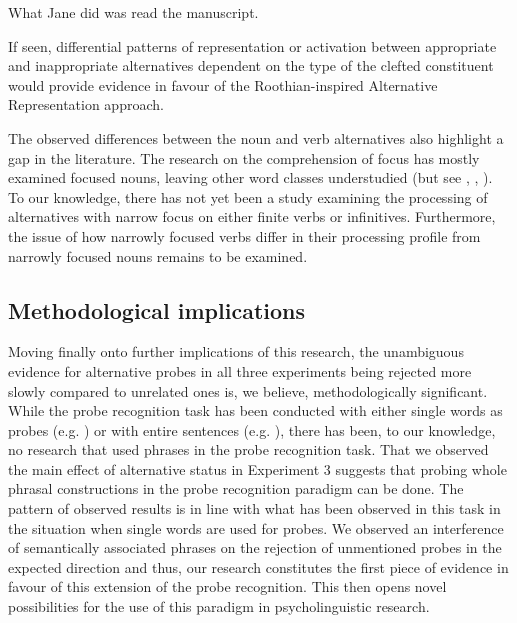 \documentclass[output=paper,colorlinks,citecolor=brown]{langscibook}
\begin{document}
\ea\label{ex:ex16} What Jane did was read the manuscript.
\z

If seen, differential patterns of representation or activation between appropriate and inappropriate alternatives dependent on the type of the clefted constituent would provide evidence in favour of the Roothian-inspired Alternative Representation approach.

The observed differences between the noun and verb alternatives also highlight a gap in the literature. The research on the comprehension of focus has mostly examined focused nouns, leaving other word classes understudied (but see \citealt{ito2008anticipatory}, \citealt{fraundorf2010recognition}, \citealt{kurumada2014or}). To our knowledge, there has not yet been a study examining the processing of alternatives with narrow focus on either finite verbs or infinitives. Furthermore, the issue of how narrowly focused verbs differ in their processing profile from narrowly focused nouns remains to be examined.


\subsection{Methodological implications}

Moving finally onto further implications of this research, the unambiguous evidence for alternative probes in all three experiments being rejected more slowly compared to unrelated ones is, we believe, methodologically significant. While the probe recognition task has been conducted with either single words as probes (e.g. \citealt{cowan2013does}) or with entire sentences (e.g. \citealt{radvansky2005age}), there has been, to our knowledge, no research that used phrases in the probe recognition task. That we observed the main effect of alternative status in Experiment 3 suggests that probing whole phrasal constructions in the probe recognition paradigm can be done. The pattern of observed results is in line with what has been observed in this task in the situation when single words are used for probes. We observed an interference of semantically associated phrases on the rejection of unmentioned probes in the expected direction and thus, our research constitutes the first piece of evidence in favour of this extension of the probe recognition. This then opens novel possibilities for the use of this paradigm in psycholinguistic research. 
\end{document}
